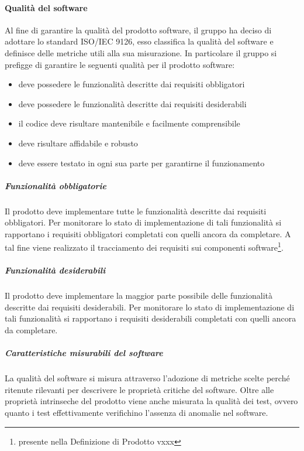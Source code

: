 \paragraph{Qualità del software}

Al fine di garantire la qualità del prodotto software, il gruppo ha deciso di adottare lo standard
ISO/IEC 9126, esso classifica la qualità del software e definisce delle metriche utili alla sua
misurazione. In particolare il gruppo si prefigge di garantire le seguenti qualità per il prodotto
software:
\begin{itemize}
\item deve possedere le funzionalità descritte dai requisiti obbligatori
\item deve possedere le funzionalità descritte dai requisiti desiderabili
\item il codice deve risultare mantenibile e facilmente comprensibile
\item deve risultare affidabile e robusto
\item deve essere testato in ogni sua parte per garantirne il
  funzionamento
\end{itemize}
\subparagraph{Funzionalità obbligatorie}
Il prodotto deve implementare tutte le funzionalità descritte dai
requisiti obbligatori. Per monitorare lo stato di implementazione di
tali funzionalità si rapportano i requisiti obbligatori
completati con quelli ancora da completare. A tal fine viene
realizzato il tracciamento dei requisiti sui componenti
software\footnote{presente nella Definizione di
  Prodotto vxxx}.
\subparagraph{Funzionalità desiderabili}
Il prodotto deve implementare la maggior parte possibile delle
funzionalità descritte dai requisiti desiderabili. Per monitorare lo
stato di implementazione di tali funzionalità si rapportano i
requisiti desiderabili
completati con quelli ancora da completare.
\subparagraph{Caratteristiche misurabili del software}
La qualità del software si misura attraverso l'adozione di metriche
scelte perché ritenute rilevanti per descrivere le proprietà
critiche del software.
Oltre alle proprietà intrinseche del prodotto viene anche misurata la
qualità dei test, ovvero quanto i test effettivamente verifichino
l'assenza di anomalie nel software.




